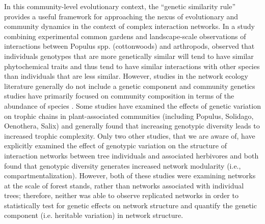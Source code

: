 \documentclass[11pt,twocolumn,twoside,lineno]{pnas-new}
\begin{document}
In this community-level evolutionary context, the ``genetic similarity
rule'' provides a useful framework for approaching the nexus of
evolutionary and community dynamics in the context of complex
interaction networks. In a study combining experimental common gardens
and landscape-scale observations of interactions between Populus spp.
(cottonwoods) and arthropods, \citep{Bangert2006} observed that
individuals genotypes that are more genetically similar will tend to
have similar phytochemical traits and thus tend to have similar
interactions with other species than individuals that are less
similar. However, studies in the network ecology literature generally
do not include a genetic component \cite{Lau2017a} and community
genetics studies have primarily focused on community composition in
terms of the abundance of species
\cite{DesRoches2018TheVariation}. Some studies have examined the
effects of genetic variation on trophic chains in plant-associated
communities (including Populus, Solidago, Oenothera, Salix)
\cite{Bailey2005ImportanceInteractions, Johnson2008, Smith2011,
  Smith2015b, Barbour2016GeneticComplexity} and generally found that
increasing genotypic diversity leads to increased trophic
complexity. Only two other studies, that we are aware of, have
explicitly examined the effect of genotypic variation on the structure
of interaction networks between tree individuals and associated
herbivores \cite{Lau2015a, Keith2017} and both found that genotypic
diversity generates increased network modularity (i.e.,
compartmentalization).  However, both of these studies were examining
networks at the scale of forest stands, rather than networks
associated with individual trees; therefore, neither was able to
observe replicated networks in order to statistically test for genetic
effects on network structure and quantify the genetic component
(i.e. heritable variation) in network structure.
\end{document}
